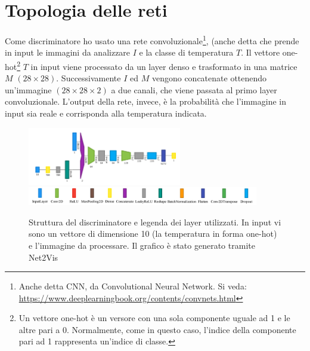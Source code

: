 \documentclass[Lau, noexaminfo, oneside]{sapthesis} %
\begin{document}
\section{Topologia delle reti}
Come discriminatore ho usato una rete convoluzionale\footnote{Anche detta CNN, da Convolutional Neural Network. Si veda: \url{https://www.deeplearningbook.org/contents/convnets.html}}, (anche detta che prende in input le immagini da analizzare $I$ e la classe di temperatura $T$. Il vettore one-hot\footnote{Un vettore one-hot è un versore con una sola componente uguale ad 1 e le altre pari a 0. Normalmente, come in questo caso, l'indice della componente pari ad 1 rappresenta un'indice di classe.} $T$ in input viene processato da un layer denso e trasformato in una matrice $M$ $(28\times28)$. Successivamente $I$ ed $M$ vengono concatenate ottenendo un'immagine $(28\times28\times2)$ a due canali, che viene passata al primo layer convoluzionale. L'output della rete, invece, è la probabilità che l'immagine in input sia reale e corrisponda alla temperatura indicata.
\begin{figure}[H]
\includegraphics[width=0.6\textwidth]{dis.png}\\
\includegraphics[width=0.9\textwidth]{legend.jpg}
\centering
\caption[...]{Struttura del discriminatore e legenda dei layer utilizzati\protect\footnotemark. In input vi sono un vettore di dimensione 10 (la temperatura in forma one-hot) e l'immagine da processare. Il grafico è stato generato tramite Net2Vis \cite{net2vis}}
\end{figure}
\end{document}
